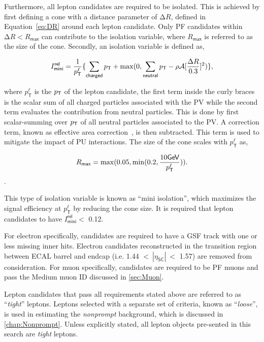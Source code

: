 Furthermore, all lepton candidates are required to be isolated. This is achieved by first defining a cone with a distance parameter of $\mathrm{\Delta}R$, defined in Equation~\ref{eq:DR} around each lepton candidate. Only \ac{PF} candidates within $\mathrm{\Delta}R<R_{\textsf{max}}$ can contribute to the isolation variable, where $R_{\textsf{max}}$ is referred to as the size of the cone. Secondly, an isolation variable is defined as,

\begin{equation}
\label{eq:mini}
I^{\textsf{rel}}_{\textsf{mini}} = \frac{1}{p_{\textsf{T}}^{\ell}} \{\sum_{\textsf{charged}}p_{\textsf{T}}+\max(0,\sum_{\textsf{neutral}}p_{\textsf{T}}-\rho \mathcal{A}[\frac{\mathrm{\Delta}R}{0.3}]^2)\},
\end{equation}

where $p_{\textsf{T}}^{\ell}$ is the $p_{\textsf{T}}$ of the lepton candidate, the first term inside the curly braces is the scalar sum of all charged particles associated with the \ac{PV} while the second term evaluates the contribution from neutral particles. This is done by first scalar-summing over $p_{\textsf{T}}$ of all neutral particles associated to the \ac{PV}. A correction term, known as effective area correction~\cite{Cacciari:2007fd}, is then subtracted. This term is used to mitigate the impact of \ac{PU} interactions. The size of the cone scales with $p_{\textsf{T}}^{\ell}$ as,  

\begin{equation}
R_{\textsf{max}} = \max (0.05, \min(0.2, \frac{10\textsf{GeV}}{p_{\textsf{T}}^{\ell}})).
\end{equation}.

This type of isolation variable is known as ``mini isolation'', which maximizes the signal efficiency at $p_{\textsf{T}}^{\ell}$ by reducing the cone size. It is required that lepton candidates to have $I^{\textsf{rel}}_{\textsf{mini}}<$ 0.12.

For electron specifically, candidates are required to have a GSF track with one or less missing inner hits. Electron candidates reconstructed in the transition region between ECAL barrel and endcap (i.e. 1.44 $<~|\eta_{\textsf{SC}}|~<$ 1.57) are removed from consideration. For muon specifically, candidates are required to be \ac{PF} muons and pass the Medium muon ID discussed in \autoref{sec:Muon}.

Lepton candidates that pass all requirements stated above are referred to as ``\emph{tight}'' leptons. Leptons selected with a separate set of criteria, known as ``\emph{loose}'', is used in estimating the \emph{nonprompt} background, which is discussed in \autoref{chap:Nonprompt}. Unless explicitly stated, all lepton objects pre-sented in this search are \emph{tight} leptons.

